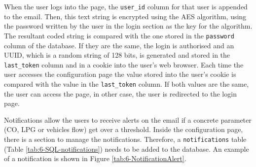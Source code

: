 When the user logs into the page, the \texttt{user\_id} column for that user is appended to the email. Then, this text string is encrypted using the \ac{AES} algorithm, using the password written by the user in the login section as the key for the algorithm. The resultant coded string is compared with the one stored in the \texttt{password} column of the database. If they are the same, the login is authorised and an \ac{UUID}, which is a random string of 128 bits, is generated and stored in the \texttt{last\_token} column and in a cookie into the user's web browser. Each time the user accesses the configuration page the value stored into the user's cookie is compared with the value in the \texttt{last\_token} column. If both values are the same, the user can access the page, in other case, the user is redirected to the login page.

Notifications allow the users to receive alerts on the email if a concrete parameter (CO, LPG or vehicles flow) get over a threshold. Inside the configuration page, there is a section to manage the notifications. Therefore, a \texttt{notifications} table (Table \ref{tab:6-SQL-notifications}) needs to be added to the database. An example of a notification is shown in Figure \ref{tab:6-NotificationAlert}.

